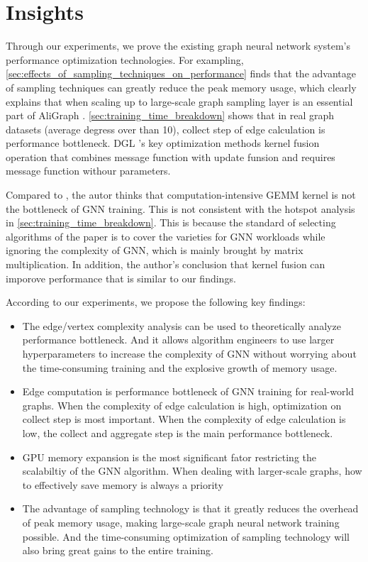 \section{Insights}

Through our experiments, we prove the existing graph neural network system's performance optimization
technologies. For exampling, \ref{sec:effects_of_sampling_techniques_on_performance} finds that the advantage of 
sampling techniques can greatly reduce the peak memory usage, which clearly explains that when scaling up to large-scale
graph sampling layer is an essential part of AliGraph \cite{zhu2019_aligraph}. \ref{sec:training_time_breakdown} shows that in real graph datasets
(average degress over than 10), collect step of edge calculation is performance bottleneck. DGL \cite{DGL}'s key optimization
methods kernel fusion operation that combines message function with update funsion and requires message function withour parameters. 

Compared to \cite{zhang2020_analysis_neugraph}, the autor thinks that computation-intensive GEMM kernel is not the bottleneck of GNN training. This
is not consistent with the hotspot analysis in \ref{sec:training_time_breakdown}. This is because the standard of selecting algorithms of the paper is to cover the varieties for GNN workloads 
while ignoring the complexity of GNN, which is mainly brought by matrix multiplication. In addition, the author's conclusion that kernel fusion can imporove performance
that is similar to our findings.

According to our experiments, we propose the following key findings:

\begin{itemize}
    \item The edge/vertex complexity analysis can be used to theoretically analyze performance bottleneck. And it allows algorithm engineers to use larger hyperparameters to
    increase the complexity of GNN without worrying about the time-consuming training and the explosive growth of memory usage.
    \item Edge computation is performance bottleneck of GNN training for real-world graphs. When the complexity of edge calculation is high, 
    optimization on collect step is most important. When the complexity of edge calculation is low, the collect and aggregate step is the main performance bottleneck.
    \item GPU memory expansion is the most significant fator restricting the scalabiltiy of the GNN algorithm. When dealing with larger-scale graphs, how to effectively save memory is always
    a priority
    \item The advantage of sampling technology is that it greatly reduces the overhead of peak memory usage, making large-scale graph neural network training possible.
    And the time-consuming optimization of sampling technology will also bring great gains to the entire training.
\end{itemize}



